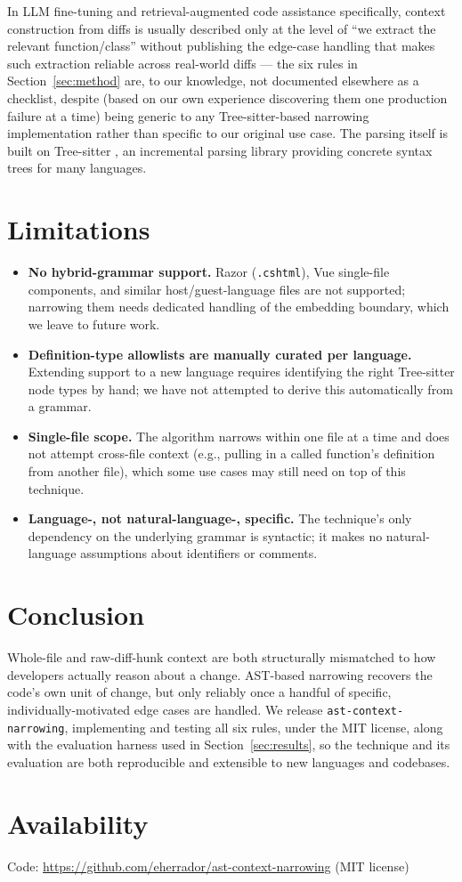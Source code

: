 \documentclass[11pt]{article}
\newcommand{\code}[1]{\texttt{#1}}
\begin{document}
In LLM fine-tuning and retrieval-augmented code assistance specifically, context
construction from diffs is usually described only at the level of ``we extract the
relevant function/class'' without publishing the edge-case handling that makes such
extraction reliable across real-world diffs --- the six rules in
Section~\ref{sec:method} are, to our knowledge, not documented elsewhere as a
checklist, despite (based on our own experience discovering them one production
failure at a time) being generic to any Tree-sitter-based narrowing implementation
rather than specific to our original use case. The parsing itself is built on
Tree-sitter \cite{treesitter}, an incremental parsing library providing concrete
syntax trees for many languages.

\section{Limitations}

\begin{itemize}
\item \textbf{No hybrid-grammar support.} Razor (\code{.cshtml}), Vue single-file
components, and similar host/guest-language files are not supported; narrowing
them needs dedicated handling of the embedding boundary, which we leave to future
work.
\item \textbf{Definition-type allowlists are manually curated per language.}
Extending support to a new language requires identifying the right Tree-sitter
node types by hand; we have not attempted to derive this automatically from a
grammar.
\item \textbf{Single-file scope.} The algorithm narrows within one file at a time
and does not attempt cross-file context (e.g., pulling in a called function's
definition from another file), which some use cases may still need on top of this
technique.
\item \textbf{Language-, not natural-language-, specific.} The technique's only
dependency on the underlying grammar is syntactic; it makes no natural-language
assumptions about identifiers or comments.
\end{itemize}

\section{Conclusion}

Whole-file and raw-diff-hunk context are both structurally mismatched to how
developers actually reason about a change. AST-based narrowing recovers the code's
own unit of change, but only reliably once a handful of specific,
individually-motivated edge cases are handled. We release
\code{ast-context-narrowing}, implementing and testing all six rules, under the
MIT license, along with the evaluation harness used in Section~\ref{sec:results},
so the technique and its evaluation are both reproducible and extensible to new
languages and codebases.

\section*{Availability}

Code: \url{https://github.com/eherrador/ast-context-narrowing} (MIT license)



\end{document}
